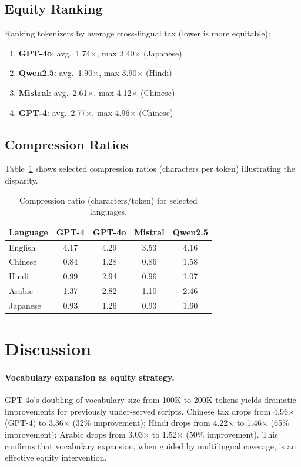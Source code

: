 \documentclass[11pt]{article}
\begin{document}
\subsection{Equity Ranking}

Ranking tokenizers by average cross-lingual tax (lower is more equitable):
\begin{enumerate}
  \item \textbf{GPT-4o}: avg.\ 1.74$\times$, max 3.40$\times$ (Japanese)
  \item \textbf{Qwen2.5}: avg.\ 1.90$\times$, max 3.90$\times$ (Hindi)
  \item \textbf{Mistral}: avg.\ 2.61$\times$, max 4.12$\times$ (Chinese)
  \item \textbf{GPT-4}: avg.\ 2.77$\times$, max 4.96$\times$ (Chinese)
\end{enumerate}

\subsection{Compression Ratios}

Table~\ref{tab:compression} shows selected compression ratios (characters per token) illustrating the disparity.

\begin{table}[h]
\centering
\small
\caption{Compression ratio (characters/token) for selected languages.}
\label{tab:compression}
\begin{tabular}{lcccc}
\toprule
\textbf{Language} & \textbf{GPT-4} & \textbf{GPT-4o} & \textbf{Mistral} & \textbf{Qwen2.5} \\
\midrule
English  & 4.17 & 4.29 & 3.53 & 4.16 \\
Chinese  & 0.84 & 1.28 & 0.86 & 1.58 \\
Hindi    & 0.99 & 2.94 & 0.96 & 1.07 \\
Arabic   & 1.37 & 2.82 & 1.10 & 2.46 \\
Japanese & 0.93 & 1.26 & 0.93 & 1.60 \\
\bottomrule
\end{tabular}
\end{table}

\section{Discussion}

\paragraph{Vocabulary expansion as equity strategy.}
GPT-4o's doubling of vocabulary size from 100K to 200K tokens yields dramatic improvements for previously under-served scripts.
Chinese tax drops from 4.96$\times$ (GPT-4) to 3.36$\times$ (32\% improvement); Hindi drops from 4.22$\times$ to 1.46$\times$ (65\% improvement); Arabic drops from 3.03$\times$ to 1.52$\times$ (50\% improvement).
This confirms that vocabulary expansion, when guided by multilingual coverage, is an effective equity intervention.
\end{document}
